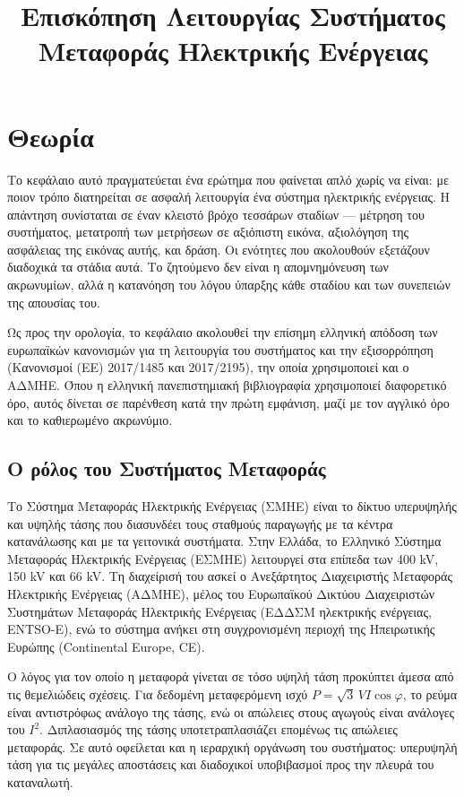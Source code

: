 \title{Επισκόπηση Λειτουργίας Συστήματος Μεταφοράς Ηλεκτρικής Ενέργειας}

\section{Θεωρία}
\label{kef-01-theoria}

Το κεφάλαιο αυτό πραγματεύεται ένα ερώτημα που φαίνεται απλό χωρίς να είναι: με ποιον
τρόπο διατηρείται σε ασφαλή λειτουργία ένα σύστημα ηλεκτρικής ενέργειας. Η απάντηση
συνίσταται σε έναν κλειστό βρόχο τεσσάρων σταδίων — μέτρηση του συστήματος, μετατροπή των
μετρήσεων σε αξιόπιστη εικόνα, αξιολόγηση της ασφάλειας της εικόνας αυτής, και δράση. Οι
ενότητες που ακολουθούν εξετάζουν διαδοχικά τα στάδια αυτά. Το ζητούμενο δεν είναι η
απομνημόνευση των ακρωνυμίων, αλλά η κατανόηση του λόγου ύπαρξης κάθε σταδίου και των
συνεπειών της απουσίας του.

Ως προς την ορολογία, το κεφάλαιο ακολουθεί την επίσημη ελληνική απόδοση των ευρωπαϊκών
κανονισμών για τη λειτουργία του συστήματος και την εξισορρόπηση (Κανονισμοί (ΕΕ) 2017/1485
και 2017/2195), την οποία χρησιμοποιεί και ο ΑΔΜΗΕ. Όπου η ελληνική πανεπιστημιακή
βιβλιογραφία χρησιμοποιεί διαφορετικό όρο, αυτός δίνεται σε παρένθεση κατά την πρώτη
εμφάνιση, μαζί με τον αγγλικό όρο και το καθιερωμένο ακρωνύμιο.

\subsection{Ο ρόλος του Συστήματος Μεταφοράς}

Το Σύστημα Μεταφοράς Ηλεκτρικής Ενέργειας (ΣΜΗΕ) είναι το δίκτυο υπερυψηλής και υψηλής
τάσης που διασυνδέει τους σταθμούς παραγωγής με τα κέντρα κατανάλωσης και με τα γειτονικά
συστήματα. Στην Ελλάδα, το Ελληνικό Σύστημα Μεταφοράς Ηλεκτρικής Ενέργειας (ΕΣΜΗΕ) λειτουργεί στα
επίπεδα των 400 kV, 150 kV και 66 kV. Τη διαχείρισή του ασκεί ο Ανεξάρτητος Διαχειριστής
Μεταφοράς Ηλεκτρικής Ενέργειας (ΑΔΜΗΕ), μέλος του Ευρωπαϊκού Δικτύου Διαχειριστών Συστημάτων
Μεταφοράς Ηλεκτρικής Ενέργειας (ΕΔΔΣΜ ηλεκτρικής ενέργειας, ENTSO-E), ενώ το σύστημα ανήκει
στη συγχρονισμένη περιοχή της Ηπειρωτικής Ευρώπης (Continental Europe, CE).

Ο λόγος για τον οποίο η μεταφορά γίνεται σε τόσο υψηλή τάση προκύπτει άμεσα από τις
θεμελιώδεις σχέσεις. Για δεδομένη μεταφερόμενη ισχύ $P = \sqrt{3}\,V I \cos\varphi$, το
ρεύμα είναι αντιστρόφως ανάλογο της τάσης, ενώ οι απώλειες στους αγωγούς είναι ανάλογες
του $I^2$. Διπλασιασμός της τάσης υποτετραπλασιάζει επομένως τις απώλειες μεταφοράς. Σε
αυτό οφείλεται και η ιεραρχική οργάνωση του συστήματος: υπερυψηλή τάση για τις μεγάλες
αποστάσεις και διαδοχικοί υποβιβασμοί προς την πλευρά του καταναλωτή.

